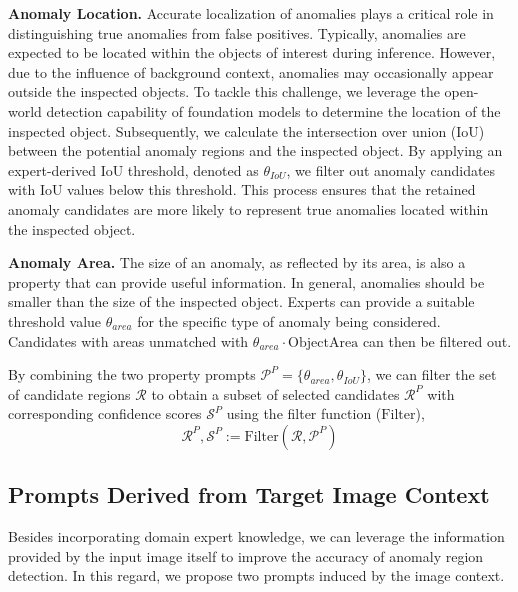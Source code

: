 \noindent\textbf{Anomaly Location.} Accurate localization of anomalies plays a critical role in distinguishing true anomalies from false positives. Typically, anomalies are expected to be located within the objects of interest during inference. However, due to the influence of background context, anomalies may occasionally appear outside the inspected objects. To tackle this challenge, we leverage the open-world detection capability of foundation models to determine the location of the inspected object. Subsequently, we calculate the intersection over union (IoU) between the potential anomaly regions and the inspected object. By applying an expert-derived IoU threshold, denoted as $\theta_{IoU}$, we filter out anomaly candidates with IoU values below this threshold. This process ensures that the retained anomaly candidates are more likely to represent true anomalies located within the inspected object.

\noindent\textbf{Anomaly Area.} The size of an anomaly, as reflected by its area, is also a property that can provide useful information. In general, anomalies should be smaller than the size of the inspected object. Experts can provide a suitable threshold value $\theta_{area}$ for the specific type of anomaly being considered. Candidates with areas unmatched with $\theta_{area} \cdot \mathrm{Object Area}$ can then be filtered out.

By combining the two property prompts $\mathcal{P}^P=\{ \theta_{area}, \theta_{IoU} \}$, we can filter the set of candidate regions $\mathcal{R}$ to obtain a subset of selected candidates $\mathcal{R}^P$ with corresponding confidence scores $\mathcal{S}^P$ using the filter function ($\mathrm{Filter}$),
\begin{equation}
    \mathcal{R}^P, \mathcal{S}^P := \mathrm{Filter}(\mathcal{R}, \mathcal{P}^P)
\end{equation}

\subsection{Prompts Derived from Target Image Context}

Besides incorporating domain expert knowledge, we can leverage the information provided by the input image itself to improve the accuracy of anomaly region detection. In this regard, we propose two prompts induced by the image context.

